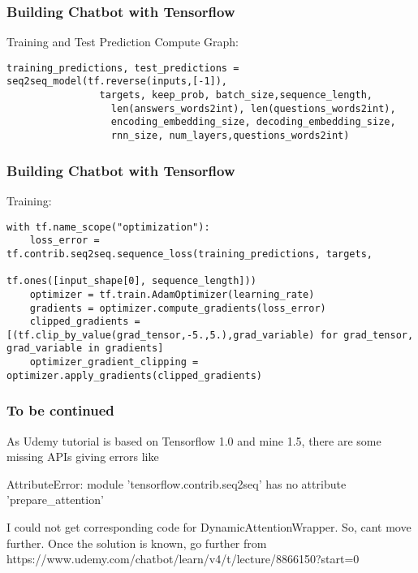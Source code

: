 \begin{frame}[fragile]\frametitle{Building Chatbot with Tensorflow}
Training and Test Prediction Compute Graph:
\begin{lstlisting}
training_predictions, test_predictions = seq2seq_model(tf.reverse(inputs,[-1]), 
                targets, keep_prob, batch_size,sequence_length,
                  len(answers_words2int), len(questions_words2int), 
                  encoding_embedding_size, decoding_embedding_size,
                  rnn_size, num_layers,questions_words2int)

\end{lstlisting}
\end{frame}


\begin{frame}[fragile]\frametitle{Building Chatbot with Tensorflow}
Training:
\begin{lstlisting}
with tf.name_scope("optimization"):
    loss_error = tf.contrib.seq2seq.sequence_loss(training_predictions, targets,
                                                  tf.ones([input_shape[0], sequence_length]))
    optimizer = tf.train.AdamOptimizer(learning_rate)
    gradients = optimizer.compute_gradients(loss_error)
    clipped_gradients = [(tf.clip_by_value(grad_tensor,-5.,5.),grad_variable) for grad_tensor, grad_variable in gradients]
    optimizer_gradient_clipping = optimizer.apply_gradients(clipped_gradients)
\end{lstlisting}
\end{frame}

\begin{frame}[fragile]\frametitle{To be continued}
As Udemy tutorial is based on Tensorflow 1.0 and  mine 1.5, there are some missing APIs giving errors like 

AttributeError: module 'tensorflow.contrib.seq2seq' has no attribute 'prepare\_attention'

I could not get corresponding code for DynamicAttentionWrapper. So, cant move further. Once the solution is known, go further from https://www.udemy.com/chatbot/learn/v4/t/lecture/8866150?start=0
\end{frame}

